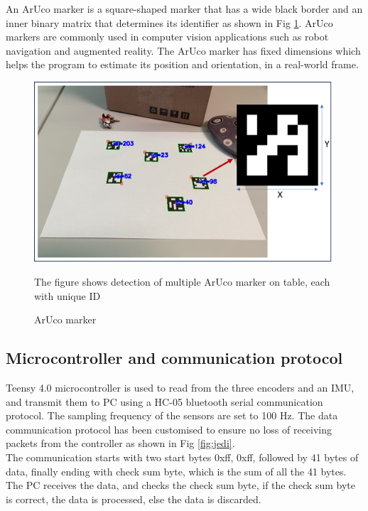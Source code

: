 \documentclass[12pt, twoside]{report}
\begin{document}
An ArUco marker is a square-shaped marker that has a wide black border
and an inner binary matrix that determines its identifier as shown in Fig \ref{fig:aruco_intro}.
ArUco markers are commonly used in computer vision applications such as robot
navigation and augmented reality. The ArUco marker has fixed dimensions which
helps the program to estimate its position and orientation, in a real-world frame.
\begin{figure}[hbt!]
    \centering
    \includegraphics[width=\textwidth]{m_aruco_intro.png}
    \caption{ArUco marker}
    {The figure shows detection of multiple ArUco marker on table, each with unique ID}
    \label{fig:aruco_intro}
\end{figure}

\subsection{Microcontroller and communication protocol}

Teensy 4.0 microcontroller is used to read from the three encoders and an IMU,
and transmit them to PC using a HC-05 bluetooth serial communication protocol. The sampling frequency of
the sensors are set to 100 Hz. The data communication protocol has been customised to ensure
no loss of receiving packets from the controller as shown in Fig \ref{fig:jedi}. \\

The communication starts with two start bytes 0xff, 0xff, followed by 41 bytes of data, finally
ending with check sum byte, which is the sum of all the 41 bytes. The PC receives the data, and
checks the check sum byte, if the check sum byte is correct, the data is processed, else the data is discarded.
\end{document}
